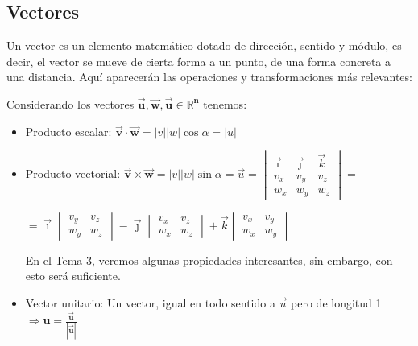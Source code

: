 \subsection{Vectores}
\noindent Un vector es un elemento matemático dotado de dirección, sentido y módulo, es decir, el vector se mueve de cierta forma a un punto, de una forma concreta a una distancia.
Aquí aparecerán las operaciones y transformaciones más relevantes:


\vspace{0.5cm}
Considerando los vectores \(\bm{\vec{u},\vec{w}, \vec{u} \in \mathbb{R}^n}\) tenemos:


\vspace{0.3cm}
\begin{itemize}
        \item Producto escalar: \( \bm{\vec{v}\cdot \vec{w}} = \left\lvert v\right\rvert \left\lvert w\right\rvert \cos{\alpha } = \left\lvert u\right\rvert \)


        \item Producto vectorial: \(\bm{\vec{v}\times \vec{w}} = \left\lvert v\right\rvert \left\lvert w\right\rvert \sin{\alpha } = \vec{u} = \begin{vmatrix}
                      \vec{\imath} & \vec{\jmath} & \vec{k} \\
                      v_x          & v_y          & v_z     \\
                      w_x          & w_y          & w_z
              \end{vmatrix} =\) \par \hspace{1.5cm} \( = \vec{\imath}
              \begin{vmatrix}
                      v_y & v_z \\
                      w_y & w_z
              \end{vmatrix}
              -\vec{\jmath} \begin{vmatrix}
                      v_x & v_z \\
                      w_x & w_z
              \end{vmatrix}
              + \vec{k} \begin{vmatrix}
                      v_x & v_y \\
                      w_x & w_y
              \end{vmatrix}
              \) \par
              En el Tema 3, veremos algunas propiedades interesantes, sin embargo, con esto será suficiente.
        \item Vector unitario: Un vector, igual en todo sentido a \(\vec{u}\) pero de longitud 1 \(\Rightarrow  \bm{\hat{u} = \frac{\vec{u}}{\left | \vec{u} \right |}}\)
\end{itemize}
